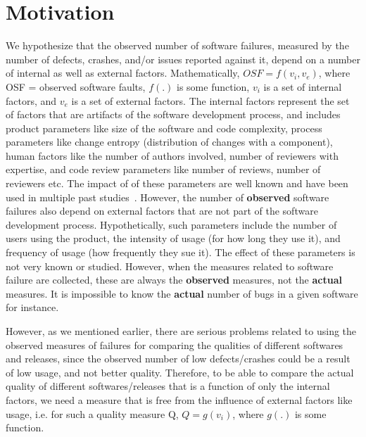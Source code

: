 \documentclass[smallcondensed]{svjour3}     %
\begin{document}
\vspace{-10pt}
\section{Motivation}\label{s:motiv}

We hypothesize that the observed number of software failures, measured by the number of defects, crashes, and/or issues reported against it, depend on a number of internal as well as external factors. Mathematically,
$ OSF = f(v_i, v_e) $, where OSF = observed software faults, $f(.)$ is some function, $v_i$ is a set of internal factors, and $v_e$ is a set of external factors. The internal factors represent the set of factors that are artifacts of the software development process, and includes product parameters like size of the software and code complexity, process parameters like change entropy (distribution of changes with a component), human factors like the number of authors involved, number of reviewers with expertise, and code review parameters like number of reviews, number of reviewers etc. The impact of of these parameters are well known and have been used in multiple past studies~\cite{CMRH09,mcintosh2015emse,mcintosh2014impact,rigby2013convergent,kononenko2015investigating}. However, the number of \textbf{observed} software failures also depend on external factors that are not part of the software development process. Hypothetically, such parameters include the number of users using the product, the intensity of usage (for how long they use it), and frequency of usage (how frequently they sue it). The effect of these parameters is not very known or studied. However, when the measures related to software failure are collected, these are always the \textbf{observed} measures, not the \textbf{actual} measures. It is impossible to know the \textbf{actual} number of bugs in a given software for instance. 

However, as we mentioned earlier, there are serious problems related to using the observed measures of failures for comparing the qualities of different softwares and releases, since the observed number of low defects/crashes could be a result of low usage, and not better quality. Therefore, to be able to compare the actual quality of different softwares/releases that is a function of only the internal factors, we need a measure that is free from the influence of external factors like usage, i.e. for such a quality measure Q, $Q = g(v_i)$, where $g(.)$ is some function.
\end{document}
